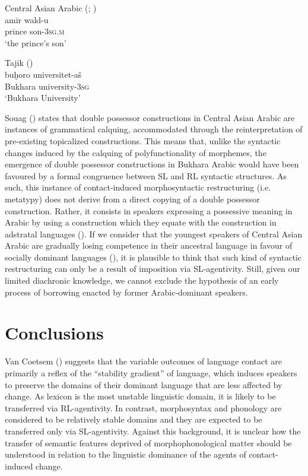 \documentclass[output=paper]{langsci/langscibook}
\begin{document}
\ea\label{ex:key:28}
{Central Asian Arabic (\citealt{Ratcliffe2005}; \citealt[56]{Souag2017clitic})}\\
\gll   amīr wald-u\\
        prince son-\textsc{3sg.m}\\
\glt   `the prince’s son'
\z

\ea\label{ex:key:29}
{Tajik (\citealt[56]{Souag2017clitic})}\\
\gll   buḫoro universitet-aš\\
       Bukhara university-\textsc{3sg}\\
\glt   `Bukhara University'
\z

Souag (\citeyear[157]{Souag2017clitic}) states that double possessor constructions in Central Asian Arabic are instances of grammatical calquing, accommodated through the reinterpretation of pre-existing topicalized constructions. This means that, unlike the syntactic changes induced by the calquing of polyfunctionality of morphemes, the emergence of double possessor constructions in Bukhara Arabic would have been favoured by a formal congruence between SL and RL syntactic structures. As such, this instance of contact-induced morphosyntactic restructuring (i.e. metatypy) does not derive from a direct copying of a double possessor construction. Rather, it consists in speakers expressing a possessive meaning in Arabic by using a construction which they equate with the construction in adstratal languages (\citealt[128]{Ross2007}). If we consider that the youngest speakers of Central Asian Arabic are gradually losing competence in their ancestral language in favour of socially dominant languages (\citealt[128]{Chikovani2005}), it is plausible to think that such kind of syntactic restructuring can only be a result of imposition via SL-agentivity. Still, given our limited diachronic knowledge, we cannot exclude the hypothesis of an early process of borrowing enacted by former Arabic-dominant speakers.   

\section{Conclusions}

Van Coetsem (\citeyear[20]{VanCoetsem1988}) suggests that the variable outcomes of language contact are primarily a reflex of the ``stability gradient'' of language, which induces speakers to preserve the domains of their dominant language that are less affected by change. As lexicon is the most unstable linguistic domain, it is likely to be transferred via RL-agentivity. In contrast, morphosyntax and phonology are considered to be relatively stable domains and they are expected to be transferred only via SL-agentivity. Against this background, it is unclear how the transfer of semantic features deprived of morphophonological matter should be understood in relation to the linguistic dominance of the agents of contact-induced change. 
\end{document}
